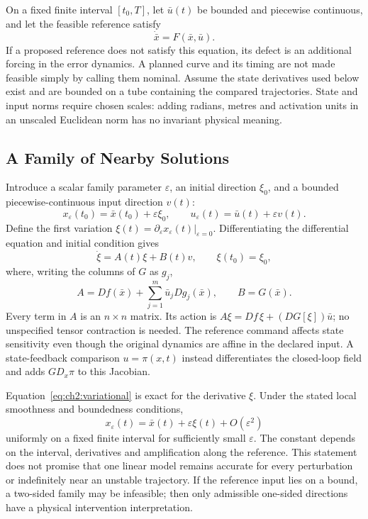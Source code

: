 On a fixed finite interval $[t_0,T]$, let $\bar u(t)$ be bounded and piecewise continuous, and let the feasible reference satisfy
\begin{equation}
\dot{\bar x}=F(\bar x,\bar u).
\label{eq:ch2:nominal}
\end{equation}
If a proposed reference does not satisfy this equation, its defect is an additional forcing in the error dynamics. A planned curve and its timing are not made feasible simply by calling them nominal. Assume the state derivatives used below exist and are bounded on a tube containing the compared trajectories. State and input norms require chosen scales: adding radians, metres and activation units in an unscaled Euclidean norm has no invariant physical meaning.

\subsection{A Family of Nearby Solutions}

Introduce a scalar family parameter $\varepsilon$, an initial direction $\xi_0$, and a bounded piecewise-continuous input direction $v(t)$:
\begin{equation}
x_\varepsilon(t_0)=\bar x(t_0)+\varepsilon\xi_0,
\qquad u_\varepsilon(t)=\bar u(t)+\varepsilon v(t).
\end{equation}
Define the first variation $\xi(t)=\partial_\varepsilon x_\varepsilon(t)|_{\varepsilon=0}$. Differentiating the differential equation and initial condition gives
\begin{equation}
\dot\xi=A(t)\xi+B(t)v,
\qquad \xi(t_0)=\xi_0,
\label{eq:ch2:variational}
\end{equation}
where, writing the columns of $G$ as $g_j$,
\begin{equation}
A=Df(\bar x)+\sum_{j=1}^m\bar u_j Dg_j(\bar x),
\qquad B=G(\bar x).
\label{eq:ch2:AB-def}
\end{equation}
Every term in $A$ is an $n\times n$ matrix. Its action is $A\xi=Df\,\xi+(DG[\xi])\bar u$; no unspecified tensor contraction is needed. The reference command affects state sensitivity even though the original dynamics are affine in the declared input. A state-feedback comparison $u=\pi(x,t)$ instead differentiates the closed-loop field and adds $G D_x\pi$ to this Jacobian.

Equation~\eqref{eq:ch2:variational} is exact for the derivative $\xi$. Under the stated local smoothness and boundedness conditions,
\begin{equation}
x_\varepsilon(t)=\bar x(t)+\varepsilon\xi(t)+O(\varepsilon^2)
\end{equation}
uniformly on a fixed finite interval for sufficiently small $\varepsilon$. The constant depends on the interval, derivatives and amplification along the reference. This statement does not promise that one linear model remains accurate for every perturbation or indefinitely near an unstable trajectory. If the reference input lies on a bound, a two-sided family may be infeasible; then only admissible one-sided directions have a physical intervention interpretation.

